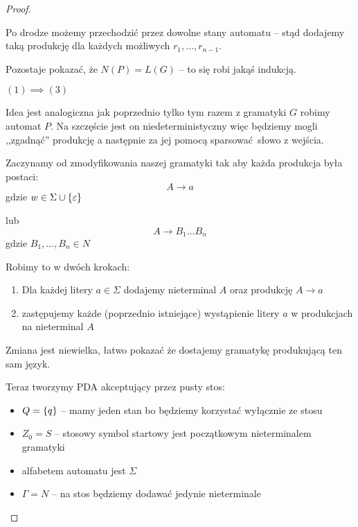 \begin{proof}
\begin{description}
        Po drodze możemy przechodzić przez dowolne stany automatu -- stąd dodajemy taką produkcję dla każdych możliwych \( r_1, \dots, r_{n-1} \).
        
        
        Pozostaje pokazać, że \( N(P) = L(G) \) -- to się robi jakąś indukcją.

    
        \item \( (1) \implies (3) \)
        
        Idea jest analogiczna jak poprzednio tylko tym razem z gramatyki \( G \) robimy automat \( P \). Na szczęście jest on niedeterministyczny więc będziemy mogli ,,zgadnąć'' produkcję a następnie za jej pomocą sparsować słowo z wejścia.
        
        
        Zaczynamy od zmodyfikowania naszej gramatyki tak aby każda produkcja była postaci:
        \[
            A \rightarrow a
        \]
        gdzie \( w \in \Sigma \cup \set{\varepsilon} \)
        
        lub 
        \[
            A \rightarrow B_1 \dots B_n
        \]
        gdzie \( B_1, \dots, B_n \in N \)
        
        Robimy to w dwóch krokach:
        \begin{enumerate}
            \item Dla każdej litery \( a \in \Sigma \) dodajemy nieterminal \( A \) oraz produkcję \( A \rightarrow a \)
            \item zastępujemy każde (poprzednio istniejące) wystąpienie litery \( a \) w produkcjach na nieterminal \( A \)
        \end{enumerate}
        
        Zmiana jest niewielka, łatwo pokazać że dostajemy gramatykę produkującą ten sam język.
        
        
        
        Teraz tworzymy PDA akceptujący przez pusty stos:
        \begin{itemize}
            \item \( Q = \set{q} \) -- mamy jeden stan bo będziemy korzystać wyłącznie ze stosu
            \item \( Z_0 = S \) -- stosowy symbol startowy jest początkowym nieterminalem gramatyki
            \item alfabetem automatu jest \( \Sigma \)
            \item \( \Gamma = N \) -- na stos będziemy dodawać jedynie nieterminale
        \end{itemize}
        

\end{description}
\end{proof}
